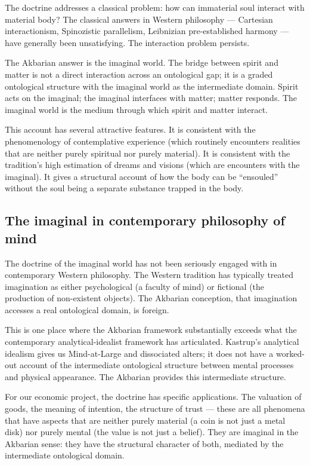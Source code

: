 The doctrine addresses a classical problem: how can immaterial
soul interact with material body? The classical answers in Western
philosophy --- Cartesian interactionism, Spinozistic parallelism,
Leibnizian pre-established harmony --- have generally been
unsatisfying. The interaction problem persists.

The Akbarian answer is the imaginal world. The bridge between
spirit and matter is not a direct interaction across an
ontological gap; it is a graded ontological structure with the
imaginal world as the intermediate domain. Spirit acts on the
imaginal; the imaginal interfaces with matter; matter responds.
The imaginal world is the medium through which spirit and matter
interact.

This account has several attractive features. It is consistent with
the phenomenology of contemplative experience (which routinely
encounters realities that are neither purely spiritual nor purely
material). It is consistent with the tradition's high estimation
of dreams and visions (which are encounters with the imaginal). It
gives a structural account of how the body can be ``ensouled''
without the soul being a separate substance trapped in the body.

\subsection{The imaginal in contemporary philosophy of mind}

The doctrine of the imaginal world has not been seriously engaged
with in contemporary Western philosophy. The Western tradition has
typically treated imagination as either psychological (a faculty of
mind) or fictional (the production of non-existent objects). The
Akbarian conception, that imagination accesses a real ontological
domain, is foreign.

This is one place where the Akbarian framework substantially exceeds
what the contemporary analytical-idealist framework has articulated.
Kastrup's analytical idealism gives us Mind-at-Large and dissociated
alters; it does not have a worked-out account of the intermediate
ontological structure between mental processes and physical
appearance. The Akbarian  provides this
intermediate structure.

For our economic project, the doctrine has specific applications.
The valuation of goods, the meaning of intention, the structure of
trust --- these are all phenomena that have aspects that are
neither purely material (a coin is not just a metal disk) nor purely
mental (the value is not just a belief). They are imaginal in the
Akbarian sense: they have the structural character of both, mediated
by the intermediate ontological domain.

